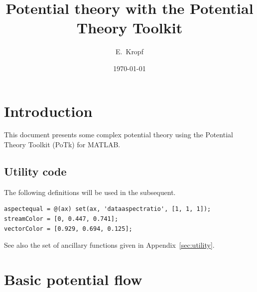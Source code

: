 \documentclass[12pt,fleqn]{article}
\begin{document}
\title{Potential theory with the Potential Theory Toolkit}
\author{E.~Kropf}
\date{\today}
\maketitle

\section{Introduction}
This document presents some complex potential theory using the Potential Theory Toolkit (PoTk) for MATLAB.

\subsection{Utility code}
The following definitions will be used in the subsequent.
\begin{lstlisting}
aspectequal = @(ax) set(ax, 'dataaspectratio', [1, 1, 1]);
streamColor = [0, 0.447, 0.741];
vectorColor = [0.929, 0.694, 0.125];
\end{lstlisting}
See also the set of ancillary functions given in Appendix~\ref{sec:utility}.

\section{Basic potential flow}
\end{document}

